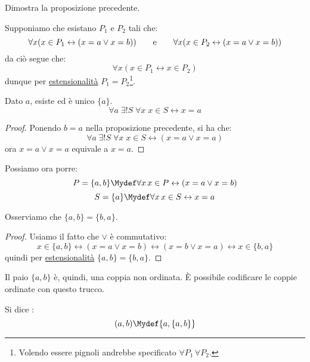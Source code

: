 \documentclass[11pt]{scrartcl}
\begin{document}
\begin{exercise}
	Dimostra la proposizione precedente.
\end{exercise}

\begin{soln}
	Supponiamo che esistano $P_1$ e $P_2$ tali che:
	\[ \forall x (x \in P_1 \leftrightarrow (x = a \lor x = b)) \qquad \text e \qquad \forall x (x \in P_2 \leftrightarrow (x = a \lor x = b))
		\]
	da ciò segue che:
	\[ \forall x (x \in P_1 \leftrightarrow x \in P_2)
		\]
	dunque per \hyperref[ax2]{estensionalità} $P_1 = P_2$\footnote{Volendo essere pignoli andrebbe specificato $\forall P_1 \, \forall P_2$.}.
\end{soln}

\begin{proposition}
	Dato $a$, esiste ed è unico $\{a\}$.
	\[ \forall a \; \exists ! S \; \forall x \; x \in S \leftrightarrow x = a
		\]
\end{proposition}

\begin{proof}
	Ponendo $b = a$ nella proposizione precedente, si ha che:
	\[ \forall a \; \exists ! S \; \forall x \; x \in S \leftrightarrow (x = a \lor x= a)
		\]
	ora $x = a \lor x = a$ equivale a $x = a$.
\end{proof}

\begin{notation}
	Possiamo ora porre:
	\[ P = \{a,b\} \Mydef \forall x \, x \in P \leftrightarrow (x = a \lor x = b)
		\]\[ S = \{a\} \Mydef \forall x \, x \in S \leftrightarrow x = a
			\]
\end{notation}

\begin{remark}
	Osserviamo che $\{a,b\} = \{b,a\}$.
\end{remark}

\begin{proof}
	Usiamo il fatto che $\lor$ è commutativo:
	\[ x \in \{a,b\} \leftrightarrow (x = a \lor x = b) \leftrightarrow (x = b \lor x = a) \leftrightarrow x \in \{b,a\}
		\]
	quindi per \hyperref[ax2]{estensionalità} $\{a,b\} = \{b,a\}$.
\end{proof}

Il paio $\{a,b\}$ è, quindi, una coppia non ordinata. È possibile codificare le coppie ordinate con questo trucco.

\begin{definition}
	Si dice :
	\[(a,b) \Mydef \{a,\{a,b\}\}
		\]
\end{definition}
\end{document}
